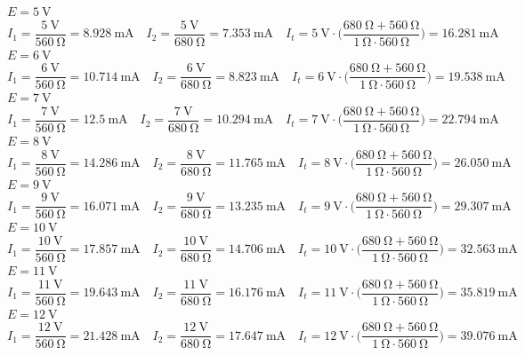 \documentclass[a4paper]{article}
\begin{document}
$E=\SI{5}{\volt}$
\[I_1=\frac{\SI{5}{\volt}}{\SI{560}{\ohm}}=\SI{8.928}{\milli\ampere}
\quad
I_2=\frac{\SI{5}{\volt}}{\SI{680}{\ohm}}=\SI{7.353}{\milli\ampere}
\quad
I_{t}=\SI{5}{\volt}\cdot\Big(\frac{\SI{680}{\ohm}+\SI{560}{\ohm}}{\SI{1}{\ohm}\cdot\SI{560}{\ohm}}\Big)=\SI{16.281}{\milli\ampere}
\]
$E=\SI{6}{\volt}$
\[I_1=\frac{\SI{6}{\volt}}{\SI{560}{\ohm}}=\SI{10.714}{\milli\ampere}
\quad
I_2=\frac{\SI{6}{\volt}}{\SI{680}{\ohm}}=\SI{8.823}{\milli\ampere}
\quad
I_{t}=\SI{6}{\volt}\cdot\Big(\frac{\SI{680}{\ohm}+\SI{560}{\ohm}}{\SI{1}{\ohm}\cdot\SI{560}{\ohm}}\Big)=\SI{19.538}{\milli\ampere}
\]
$E=\SI{7}{\volt}$
\[I_1=\frac{\SI{7}{\volt}}{\SI{560}{\ohm}}=\SI{12.5}{\milli\ampere}
\quad
I_2=\frac{\SI{7}{\volt}}{\SI{680}{\ohm}}=\SI{10.294}{\milli\ampere}
\quad
I_{t}=\SI{7}{\volt}\cdot\Big(\frac{\SI{680}{\ohm}+\SI{560}{\ohm}}{\SI{1}{\ohm}\cdot\SI{560}{\ohm}}\Big)=\SI{22.794}{\milli\ampere}
\]
$E=\SI{8}{\volt}$
\[I_1=\frac{\SI{8}{\volt}}{\SI{560}{\ohm}}=\SI{14.286}{\milli\ampere}
\quad
I_2=\frac{\SI{8}{\volt}}{\SI{680}{\ohm}}=\SI{11.765}{\milli\ampere}
\quad
I_{t}=\SI{8}{\volt}\cdot\Big(\frac{\SI{680}{\ohm}+\SI{560}{\ohm}}{\SI{1}{\ohm}\cdot\SI{560}{\ohm}}\Big)=\SI{26.050}{\milli\ampere}
\]
$E=\SI{9}{\volt}$
\[I_1=\frac{\SI{9}{\volt}}{\SI{560}{\ohm}}=\SI{16.071}{\milli\ampere}
\quad
I_2=\frac{\SI{9}{\volt}}{\SI{680}{\ohm}}=\SI{13.235}{\milli\ampere}
\quad
I_{t}=\SI{9}{\volt}\cdot\Big(\frac{\SI{680}{\ohm}+\SI{560}{\ohm}}{\SI{1}{\ohm}\cdot\SI{560}{\ohm}}\Big)=\SI{29.307}{\milli\ampere}
\]
$E=\SI{10}{\volt}$
\[I_1=\frac{\SI{10}{\volt}}{\SI{560}{\ohm}}=\SI{17.857}{\milli\ampere}
\quad
I_2=\frac{\SI{10}{\volt}}{\SI{680}{\ohm}}=\SI{14.706}{\milli\ampere}
\quad
I_{t}=\SI{10}{\volt}\cdot\Big(\frac{\SI{680}{\ohm}+\SI{560}{\ohm}}{\SI{1}{\ohm}\cdot\SI{560}{\ohm}}\Big)=\SI{32.563}{\milli\ampere}
\]
$E=\SI{11}{\volt}$
\[I_1=\frac{\SI{11}{\volt}}{\SI{560}{\ohm}}=\SI{19.643}{\milli\ampere}
\quad
I_2=\frac{\SI{11}{\volt}}{\SI{680}{\ohm}}=\SI{16.176}{\milli\ampere}
\quad
I_{t}=\SI{11}{\volt}\cdot\Big(\frac{\SI{680}{\ohm}+\SI{560}{\ohm}}{\SI{1}{\ohm}\cdot\SI{560}{\ohm}}\Big)=\SI{35.819}{\milli\ampere}
\]
$E=\SI{12}{\volt}$
\[I_1=\frac{\SI{12}{\volt}}{\SI{560}{\ohm}}=\SI{21.428}{\milli\ampere}
\quad
I_2=\frac{\SI{12}{\volt}}{\SI{680}{\ohm}}=\SI{17.647}{\milli\ampere}
\quad
I_{t}=\SI{12}{\volt}\cdot\Big(\frac{\SI{680}{\ohm}+\SI{560}{\ohm}}{\SI{1}{\ohm}\cdot\SI{560}{\ohm}}\Big)=\SI{39.076}{\milli\ampere}
\]
\end{document}
